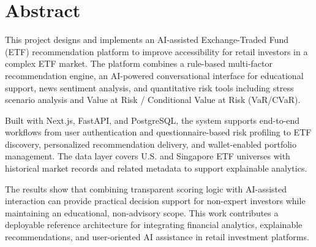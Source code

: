\chapter*{Abstract}

This project designs and implements an AI-assisted Exchange-Traded Fund (ETF) recommendation platform to improve accessibility for retail investors in a complex ETF market. The platform combines a rule-based multi-factor recommendation engine, an AI-powered conversational interface for educational support, news sentiment analysis, and quantitative risk tools including stress scenario analysis and Value at Risk / Conditional Value at Risk (VaR/CVaR).

Built with Next.js, FastAPI, and PostgreSQL, the system supports end-to-end workflows from user authentication and questionnaire-based risk profiling to ETF discovery, personalized recommendation delivery, and wallet-enabled portfolio management. The data layer covers U.S. and Singapore ETF universes with historical market records and related metadata to support explainable analytics.

The results show that combining transparent scoring logic with AI-assisted interaction can provide practical decision support for non-expert investors while maintaining an educational, non-advisory scope. This work contributes a deployable reference architecture for integrating financial analytics, explainable recommendations, and user-oriented AI assistance in retail investment platforms.


